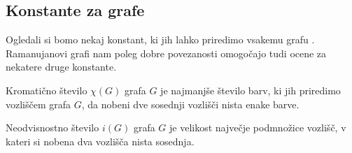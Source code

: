 \subsection{Konstante za grafe}
Ogledali si bomo nekaj konstant, ki jih lahko priredimo vsakemu grafu \cite{ramanujan-construction-book}. Ramanujanovi grafi nam poleg dobre povezanosti omogočajo tudi ocene za nekatere druge konstante.

\begin{definicija}
    Kromatično število \(\chi(G)\) grafa \(G\) je najmanjše število barv, ki jih priredimo vozliščem grafa \(G\), da nobeni dve sosednji vozlišči nista enake barve.
\end{definicija}
\begin{definicija}
    Neodvisnostno število \(i(G)\) grafa \(G\) je velikost največje podmnožice vozlišč, v kateri si nobena dva vozlišča nista sosednja.
\end{definicija}

